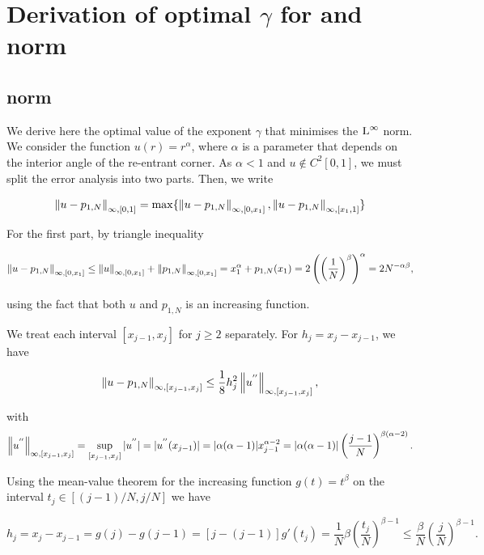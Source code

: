 \documentclass[a4paper,11pt]{article}
\begin{document}
\clearpage
\newpage

\appendix


\section{Derivation of optimal $\gamma$ for \leb{\infty} and  norm}

\subsection{\leb{\infty} norm}

We derive here the optimal value of the exponent $\gamma$ that minimises the $\operatorname L^{\infty}$ norm. We consider the function $u(r) = r^{\alpha}$, where $\alpha$ is a parameter that depends on the interior angle of the re-entrant corner. 
As $\alpha < 1$ and $u \not\in C^{2}[0,1]$, we must split the error analysis into two parts. Then, we write 

$$\left\|u - p_{1,N}\right\|_{\infty,[0,1]} = \max \{ \left\|u - p_{1,N}\right\|_{\infty,[0,x_{1}]}, \left\|u - p_{1,N}\right\|_{\infty,[x_{1},1]}\}$$

For the first part, by triangle inequality

\begin{equation}
\label{eq:ineq1}
\left\|u - p_{1,N}\right\|_{\infty,[0,x_{1}]} \leq \left\|u\right\|_{\infty,[0,x_{1}]} + \left\|p_{1,N}\right\|_{\infty,[0,x_{1}]} = x_{1}^{\alpha} + p_{1,N}(x_{1}) = 2\left( \left(\frac{1}{N}\right)^{\beta}\right)^{\alpha} = 2N^{- \alpha \beta },  
\end{equation}

using the fact that both $u$ and $p_{1,N}$ is an increasing function.

We treat each interval $[x_{j-1},x_{j}]$ for $j \geq 2$ separately. For $h_{j} = x_{j} - x_{j-1}$, we have

$$\left\|u - p_{1,N}\right\|_{\infty,[x_{j-1},x_{j}]} \leq \frac{1}{8} h_{j}^{2} \left\|u^{''}\right\|_{\infty,[x_{j-1},x_{j}]}, $$


with $$ \left\|u^{''}\right\|_{\infty,[x_{j-1},x_{j}]} = \sup_{[x_{j-1},x_{j}]} |u^{''}| = |u^{''}(x_{j-1})| = |\alpha(\alpha - 1)|x_{j-1}^{\alpha -2} = |\alpha(\alpha - 1)| \left(\frac{j-1}{N}  \right)^{\beta(\alpha -2)}.$$

Using the mean-value theorem for the increasing function $g(t) = t^{\beta}$ on the interval $t_{j} \in [(j-1)/N,j/N]$ we have

$$ h_{j} = x_{j} - x_{j-1} = g(j) - g(j-1) = [j - (j-1)]g'(t_{j}) = \frac{1}{N} \beta \left(\frac{t_{j}}{N}\right)^{\beta - 1} \leq \frac{\beta}{N} \left(\frac{j}{N}\right)^{\beta - 1}.$$
\end{document}
